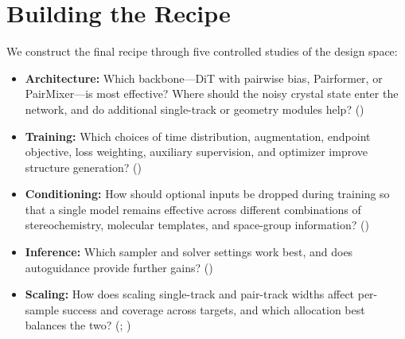 \section{Building the Recipe}
\label{sec:recipe}
\label{sec:ablations}

We construct the final \model{} recipe through five controlled studies of the
design space:
\begin{itemize}
    \item \textbf{Architecture:} Which backbone---DiT with pairwise bias,
    Pairformer, or PairMixer---is most effective? Where should the noisy crystal
    state enter the network, and do additional single-track or geometry modules
    help? ()
    
    \item \textbf{Training:} Which choices of time distribution, augmentation,
    endpoint objective, loss weighting, auxiliary supervision, and optimizer
    improve structure generation?
    ()
    
    \item \textbf{Conditioning:} How should optional inputs be dropped during
    training so that a single model remains effective across different
    combinations of stereochemistry, molecular templates, and space-group
    information? ()
    
    \item \textbf{Inference:} Which sampler and solver settings work best, and
    does autoguidance provide further gains?
    ()

    \item \textbf{Scaling:} How does scaling single-track and pair-track widths
    affect per-sample success and coverage across targets, and which allocation
    best balances the two?
    (;
    )
\end{itemize}







